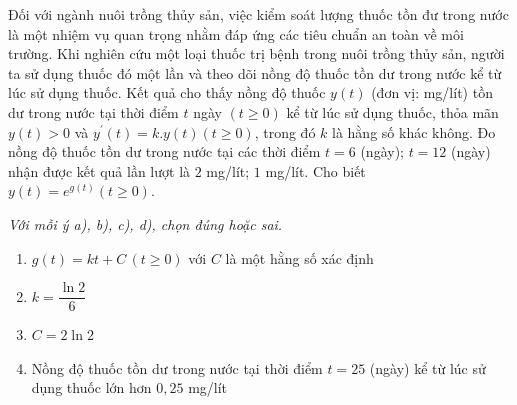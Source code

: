 \documentclass{exam}
\begin{document}
\begin{question}
Đối với ngành nuôi trồng thủy sản, việc kiểm soát lượng thuốc tồn đư trong nước là một nhiệm vụ quan trọng nhằm đáp ứng các tiêu chuẩn an toàn về môi trường. Khi nghiên cứu một loại thuốc trị bệnh trong nuôi trồng thủy sản, người ta sử dụng thuốc đó một lần và theo dõi nồng độ thuốc tồn dư trong nước kể từ lúc sử dụng thuốc. Kết quả cho thấy nồng độ thuốc $y(t)$ (đơn vị: mg/lít) tồn dư trong nước tại thời điểm $t$ ngày $(t \geq 0)$ kể từ lúc sử dụng thuốc, thỏa mãn $y(t)>0$ và $y^{\prime}(t)=k .y(t)(t \geq 0)$, trong đó $k$ là hằng số khác không. Đo nồng độ thuốc tồn dư trong nước tại các thời điểm $t=6$ (ngày); $t=12$ (ngày) nhận được kết quả lần lượt là $2$ mg/lít; $1$ mg/lít. Cho biết $y(t)=e^{g(t)}(t \geq 0)$.

\par\vspace{0.15em}
{\small\textit{Với mỗi ý a), b), c), d), chọn đúng hoặc sai.}}
\par\vspace{0.1em}
\begin{enumerate}[label=\textbf{\alph*)}, leftmargin=1.6em, itemsep=0.2em, topsep=0.2em]

\item $g(t)=k t+C\,(t \geq 0)$ với $C$ là một hằng số xác định

\item $k=\dfrac{\ln 2}{6}$

\item $C=2 \ln 2$

\item Nồng độ thuốc tồn dư trong nước tại thời điểm $t=25$ (ngày) kể từ lúc sử dụng thuốc lớn hơn $0,25$ mg/lít

\end{enumerate}

\end{question}
\end{document}
